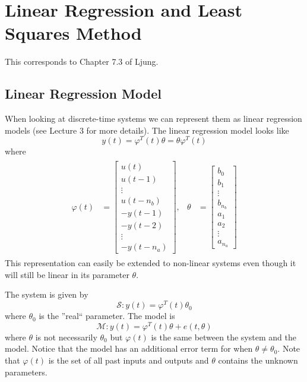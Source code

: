 \documentclass[lecture,12pt,]{pcms-l}
\begin{document}
\section{Linear Regression and Least Squares Method}
This corresponds to Chapter 7.3 of Ljung.

\subsection{Linear Regression Model}
When looking at discrete-time systems we can represent them as linear regression models (see Lecture 3 for more details). The linear regression model looks like
$$y(t) = \varphi^T(t)\theta = \theta\varphi^T(t)$$
where
\begin{align*}
\begin{split}
\varphi(t) &= \left[\begin{array}{c} u(t) \\ u(t-1) \\ \vdots \\ u(t-n_b) \\ -y(t-1) \\ -y(t-2) \\ \vdots \\ -y(t-n_a) \end{array}\right],
\end{split}
\begin{split}
\theta &= \left[\begin{array}{c} b_0 \\ b_1 \\ \vdots \\ b_{n_b} \\ a_1 \\ a_2 \\ \vdots \\ a_{n_a} \end{array}\right]
\end{split}
\end{align*}
This representation can easily be extended to non-linear systems even though it will still be linear in its parameter $\theta$.

The system is given by
$$\mathcal{S}: y(t) = \varphi^T(t)\theta_0$$
where $\theta_0$ is the ''real`` parameter. The model is
$$\mathcal{M}: y(t) = \varphi^T(t)\theta + e(t,\theta)$$
where $\theta$ is not necessarily $\theta_0$ but $\varphi(t)$ is the same between the system and the model. Notice that the model has an additional error term for when $\theta\neq\theta_0$. Note that $\varphi(t)$ is the set of all past inputs and outputs and $\theta$ contains the unknown parameters.
\end{document}
